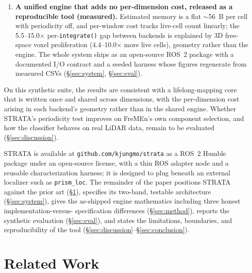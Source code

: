 \documentclass[conference]{IEEEtran}
\begin{document}
\begin{enumerate}
   0.653/0.707, well above the 0.3 threshold) at true-positive rate 2/3 and
   false-positive rate 1/5, with the single miss diagnosed as a prune/maturity
   race; and hysteresis is the dominant stabilizer --- removing it yields 574
   flicker toggles at F1 0.810 versus 54 toggles at F1 1.000 on identical
   replayed noise at the same decay ($\lambda=0.90$) (\S\ref{sec:eval}).
\item \textbf{A unified engine that adds no per-dimension cost, released as a
   reproducible tool (measured).} Estimated memory is a flat $\sim$56~B per cell
   with periodicity off, and per-window cost tracks live-cell count linearly; the
   5.5--15.0$\times$ per-\texttt{integrate()} gap between backends is explained by
   3D free-space voxel proliferation (4.4--10.0$\times$ more live cells), geometry
   rather than the engine. The whole system ships as
   an open-source ROS~2 package with a documented I/O contract and a seeded
   harness whose figures regenerate from measured CSVs (\S\ref{sec:system}, \S\ref{sec:eval}).
\end{enumerate}

On this synthetic suite, the results are consistent with a lifelong-mapping
core that is written once and shared across dimensions, with the per-dimension
cost arising in each backend's geometry rather than in the shared engine.
Whether STRATA's periodicity test improves on FreMEn's own component
selection, and how the classifier behaves on real LiDAR data, remain to be
evaluated (\S\ref{sec:discussion}).

STRATA is available at \texttt{github.com/kjungmo/strata} as a ROS~2 Humble package
under an open-source license, with a thin ROS adapter node and a reusable
characterization harness; it is designed to plug beneath an external localizer
such as \texttt{prism\_loc}. The remainder of the paper positions STRATA against the
prior art (\S\ref{sec:related}), specifies its two-band, testable architecture (\S\ref{sec:system}), gives the
as-shipped engine mathematics including three honest implementation-versus-
specification differences (\S\ref{sec:method}), reports the synthetic evaluation (\S\ref{sec:eval}), and
states the limitations, boundaries, and reproducibility of the tool (\S\ref{sec:discussion}--\S\ref{sec:conclusion}).

\section{Related Work}
\label{sec:related}
\end{document}

